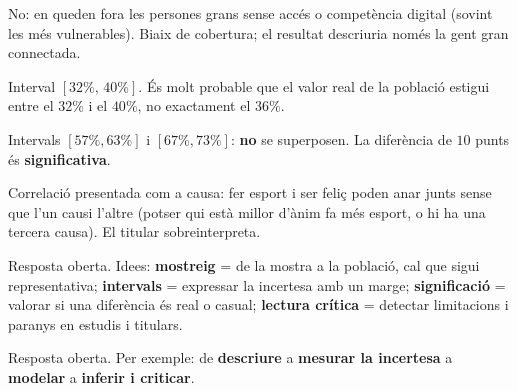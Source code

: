 \begin{solucions}
\begin{sollist}
  \item No: en queden fora les persones grans sense accés o competència digital (sovint les
        més vulnerables). Biaix de cobertura; el resultat descriuria només la gent gran
        connectada.
  \item Interval $[32\%,\,40\%]$. És molt probable que el valor real de la població estigui
        entre el $32\%$ i el $40\%$, no exactament el $36\%$.
  \item Intervals $[57\%,63\%]$ i $[67\%,73\%]$: \textbf{no} se superposen. La diferència de
        $10$ punts és \textbf{significativa}.
  \item Correlació presentada com a causa: fer esport i ser feliç poden anar junts sense que
        l'un causi l'altre (potser qui està millor d'ànim fa més esport, o hi ha una tercera
        causa). El titular sobreinterpreta.
  \item Resposta oberta. Idees: \textbf{mostreig} = de la mostra a la població, cal que
        sigui representativa; \textbf{intervals} = expressar la incertesa amb un marge;
        \textbf{significació} = valorar si una diferència és real o casual; \textbf{lectura
        crítica} = detectar limitacions i paranys en estudis i titulars.
  \item Resposta oberta. Per exemple: de \textbf{descriure} a \textbf{mesurar la incertesa}
        a \textbf{modelar} a \textbf{inferir i criticar}.
\end{sollist}
\end{solucions}

